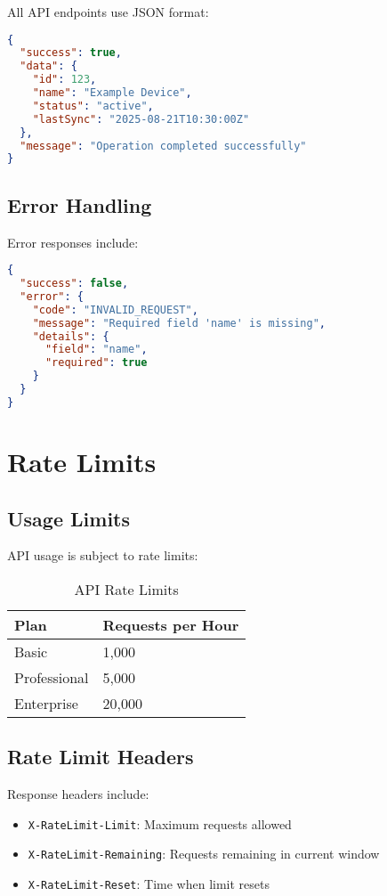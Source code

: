 All API endpoints use JSON format:

\begin{lstlisting}[language=json]
{
  "success": true,
  "data": {
    "id": 123,
    "name": "Example Device",
    "status": "active",
    "lastSync": "2025-08-21T10:30:00Z"
  },
  "message": "Operation completed successfully"
}
\end{lstlisting}

\subsection{Error Handling}

Error responses include:

\begin{lstlisting}[language=json]
{
  "success": false,
  "error": {
    "code": "INVALID_REQUEST",
    "message": "Required field 'name' is missing",
    "details": {
      "field": "name",
      "required": true
    }
  }
}
\end{lstlisting}

\section{Rate Limits}

\subsection{Usage Limits}

API usage is subject to rate limits:

\begin{table}[H]
\centering
\begin{tabular}{@{}ll@{}}
\toprule
\textbf{Plan} & \textbf{Requests per Hour} \\
\midrule
Basic & 1,000 \\
Professional & 5,000 \\
Enterprise & 20,000 \\
\bottomrule
\end{tabular}
\caption{API Rate Limits}
\label{tab:rate_limits}
\end{table}

\subsection{Rate Limit Headers}

Response headers include:

\begin{itemize}
    \item \texttt{X-RateLimit-Limit}: Maximum requests allowed
    \item \texttt{X-RateLimit-Remaining}: Requests remaining in current window
    \item \texttt{X-RateLimit-Reset}: Time when limit resets
\end{itemize}

